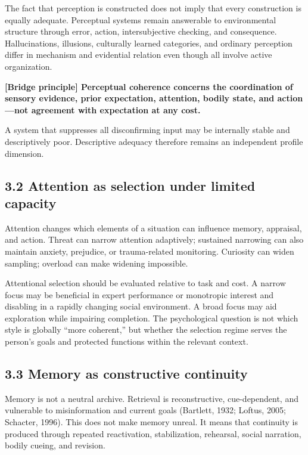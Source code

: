 \documentclass[
  11pt,
]{article}
\begin{document}
The fact that perception is constructed does not imply that every
construction is equally adequate. Perceptual systems remain answerable
to environmental structure through error, action, intersubjective
checking, and consequence. Hallucinations, illusions, culturally learned
categories, and ordinary perception differ in mechanism and evidential
relation even though all involve active organization.

\textbf{{[}Bridge principle{]} Perceptual coherence concerns the
coordination of sensory evidence, prior expectation, attention, bodily
state, and action---not agreement with expectation at any cost.}

A system that suppresses all disconfirming input may be internally
stable and descriptively poor. Descriptive adequacy therefore remains an
independent profile dimension.

\subsection{3.2 Attention as selection under limited
capacity}\label{attention-as-selection-under-limited-capacity}

Attention changes which elements of a situation can influence memory,
appraisal, and action. Threat can narrow attention adaptively; sustained
narrowing can also maintain anxiety, prejudice, or trauma-related
monitoring. Curiosity can widen sampling; overload can make widening
impossible.

Attentional selection should be evaluated relative to task and cost. A
narrow focus may be beneficial in expert performance or monotropic
interest and disabling in a rapidly changing social environment. A broad
focus may aid exploration while impairing completion. The psychological
question is not which style is globally ``more coherent,'' but whether
the selection regime serves the person's goals and protected functions
within the relevant context.

\subsection{3.3 Memory as constructive
continuity}\label{memory-as-constructive-continuity}

Memory is not a neutral archive. Retrieval is reconstructive,
cue-dependent, and vulnerable to misinformation and current goals
(Bartlett, 1932; Loftus, 2005; Schacter, 1996). This does not make
memory unreal. It means that continuity is produced through repeated
reactivation, stabilization, rehearsal, social narration, bodily cueing,
and revision.
\end{document}
